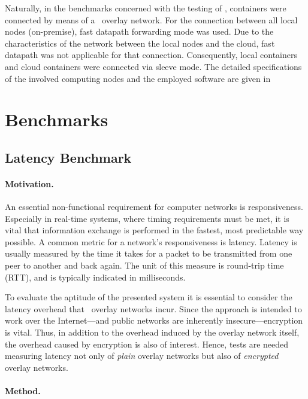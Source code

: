 Naturally, in the benchmarks concerned with the testing of \wnet , containers were connected by means of a \wnet\ overlay network. For the connection between all local nodes (on-premise), fast datapath forwarding mode was used. Due to the characteristics of the network between the local nodes and the cloud, fast datapath was not applicable for that connection. Consequently, local containers and cloud containers were connected via sleeve mode.
The detailed specifications of the involved computing nodes and the employed software are given in 


%
%
%
%
%
%
%
%
%
%
%
\section{Benchmarks}

\subsection{Latency Benchmark} \label{sec:plainlatency}
\paragraph{Motivation.} An essential non-functional requirement for computer networks is responsiveness. Especially in real-time systems, where timing requirements must be met, it is vital that information exchange is performed in the fastest, most predictable way possible. A common metric for a network's responsiveness is latency. Latency is usually measured by the time it takes for a packet to be transmitted from one peer to another and back again. The unit of this measure is round-trip time (RTT), and is typically indicated in milliseconds.

To evaluate the aptitude of the presented system it is essential to consider the latency overhead that \weave\ overlay networks incur. Since the approach is intended to work over the Internet---and public networks are inherently insecure---encryption is vital. Thus, in addition to the overhead induced by the overlay network itself, the overhead caused by encryption is also of interest. Hence, tests are needed measuring latency not only of \emph{plain} overlay networks but also of \emph{encrypted} overlay networks.


\paragraph{Method.}


